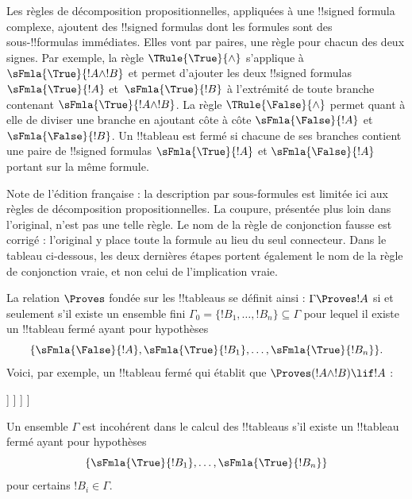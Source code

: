 \documentclass[11pt,a4paper,openany]{memoir}
\begin{document}
Les règles de décomposition propositionnelles, appliquées à une
!!{signed formula} complexe, ajoutent des !!{signed formula}s dont les
formules sont des sous-!!{formula}s immédiates. Elles vont par paires,
une règle pour chacun des deux signes. Par exemple, la règle
$\TRule{\True}{\land}$ s'applique à $\sFmla{\True}{!A \land !B}$ et
permet d'ajouter les deux !!{signed formula}s $\sFmla{\True}{!A}$
et~$\sFmla{\True}{!B}$ à l'extrémité de toute branche contenant
$\sFmla{\True}{!A \land !B}$. La règle $\TRule{\False}{\land}$
permet quant à elle de diviser une branche en ajoutant côte à côte
$\sFmla{\False}{!A}$ et $\sFmla{\False}{!B}$.
Un !!{tableau} est fermé si chacune de ses branches contient une paire
de !!{signed formula}s $\sFmla{\True}{!A}$ et $\sFmla{\False}{!A}$
portant sur la même formule.
\begin{editorial}
Note de l'édition française : la description par sous-formules est
limitée ici aux règles de décomposition propositionnelles. La coupure,
présentée plus loin dans l'original, n'est pas une telle règle.
Le nom de la règle de conjonction fausse est corrigé : l'original
y place toute la formule au lieu du seul connecteur. Dans le tableau
ci-dessous, les deux dernières étapes portent également le nom de la
règle de conjonction vraie, et non celui de l'implication vraie.
\end{editorial}

La relation $\Proves$ fondée sur les !!{tableau}s se définit ainsi :
$\Gamma \Proves !A$ si et seulement s'il existe un ensemble fini
$\Gamma_0 = \{!B_1, \dots, !B_n\} \subseteq \Gamma$ pour lequel il
existe un !!{tableau} fermé ayant pour hypothèses
\[
\{\sFmla{\False}{!A}, \sFmla{\True}{!B_1}, \dots, \sFmla{\True}{!B_n}\}.
\]
Voici, par exemple, un !!{tableau} fermé qui établit que
$\Proves (!A \land !B) \lif !A$ :
\begin{oltableau}
  [\sFmla{\False}{(\formula{A} \land \formula{B}) \lif \formula{A}}, just = \TAss
    [\sFmla{\True}{\formula{A} \land \formula{B}}, just = {\TRule{\False}{\lif}[1]}
      [\sFmla{\False}{\formula{A}}, just = {\TRule{\False}{\lif}[1]}
        [\sFmla{\True}{\formula{A}}, just = {\TRule{\True}{\land}[2]}
          [\sFmla{\True}{\formula{B}}, just = {\TRule{\True}{\land}[2]}, close]
        ]
      ]
    ]
  ]
\end{oltableau}

Un ensemble $\Gamma$ est incohérent dans le calcul des !!{tableau}s
s'il existe un !!{tableau} fermé ayant pour hypothèses
\[
\{\sFmla{\True}{!B_1}, \dots, \sFmla{\True}{!B_n}\}
\]
pour certains $!B_i \in \Gamma$.
\end{document}
